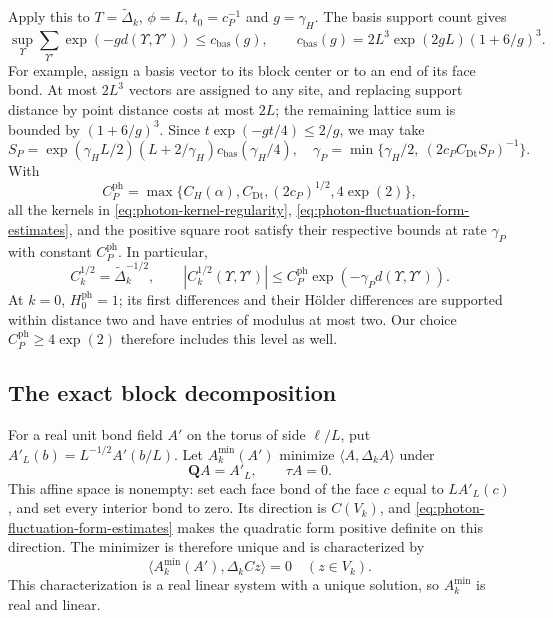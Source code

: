 \documentclass[11pt,letterpaper,reqno]{amsart}
\begin{document}
Apply this to $T=\widetilde\Delta_k$, $\phi=L$,
$t_0=c_P^{-1}$ and $g=\gamma_H$. The basis support count gives
\[
 \sup_\Upsilon\sum_{\Upsilon'}\exp(-g d(\Upsilon,\Upsilon'))
       \le c_{\mathrm{bas}}(g),\qquad
 c_{\mathrm{bas}}(g)=2L^3\exp(2gL)(1+6/g)^3.
\]
For example, assign a basis vector to its block center or to an
end of its face bond. At most $2L^3$ vectors are assigned to any
site, and replacing support distance by point distance costs at
most $2L$; the remaining lattice sum is bounded by $(1+6/g)^3$.
Since $t\exp(-gt/4)\le2/g$, we may take
\[
 S_P=\exp(\gamma_HL/2)(L+2/\gamma_H)
                          c_{\mathrm{bas}}(\gamma_H/4),
 \quad
 \gamma_P=\min\{\gamma_H/2,\ (2c_PC_{\mathrm{Dt}}S_P)^{-1}\}.
\]
With
\[
 C_P^{\mathrm{ph}}=\max\{C_H(\alpha),C_{\mathrm{Dt}},(2c_P)^{1/2},4\exp(2)\},
\]
all the kernels in \eqref{eq:photon-kernel-regularity},
\eqref{eq:photon-fluctuation-form-estimates}, and the positive
square root satisfy their respective bounds at rate $\gamma_P$
with constant $C_P^{\mathrm{ph}}$. In particular,
\begin{equation}\label{eq:photon-square-root-decay}
 C_k^{1/2}=\widetilde\Delta_k^{-1/2},\qquad
 |C_k^{1/2}(\Upsilon,\Upsilon')|
                  \le C_P^{\mathrm{ph}}\exp(-\gamma_Pd(\Upsilon,\Upsilon')).
\end{equation}
At $k=0$, $H_0^{\mathrm{ph}}=1$; its first differences and their
H\"older differences are supported within distance two and have
entries of modulus at most two. Our choice $C_P^{\mathrm{ph}}\ge4\exp(2)$
therefore includes this level as well.

\subsection{The exact block decomposition}
\label{subsec:photon-block-decomposition}

For a real unit bond field $A'$ on the torus of side $\ell/L$,
put $A'_L(b)=L^{-1/2}A'(b/L)$. Let $A_k^{\min}(A')$ minimize
$\langle A,\Delta_kA\rangle$ under
\[
 \mathbf QA=A'_L,\qquad \tau A=0.
\]
This affine space is nonempty: set each face bond of the face $c$
equal to $L A'_L(c)$, and set every interior bond to zero.
Its direction is $C(V_k)$, and
\eqref{eq:photon-fluctuation-form-estimates} makes the quadratic
form positive definite on this direction. The minimizer is
therefore unique and is characterized by
\begin{equation}\label{eq:photon-block-minimizer-orthogonality}
 \langle A_k^{\min}(A'),\Delta_kCz\rangle=0
                    \quad(z\in V_k).
\end{equation}
This characterization is a real linear system with a unique
solution, so $A_k^{\min}$ is real and linear.
\end{document}
